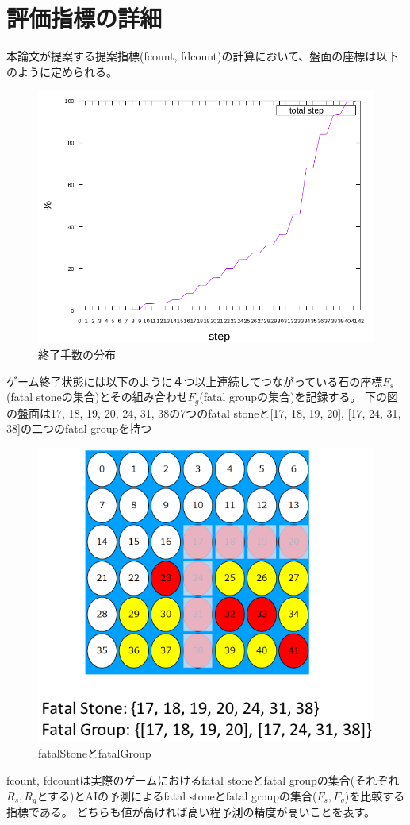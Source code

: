 \section{評価指標の詳細}
本論文が提案する提案指標(fcount, fdcount)の計算において、盤面の座標は以下のように定められる。
\begin{figure}[t]
	\centering
	\includegraphics[width=\linewidth]{./figure/stepCum.png}
	\caption{終了手数の分布}
	\label{fig:stepCUm}
\end{figure}
ゲーム終了状態には以下のように４つ以上連続してつながっている石の座標$F_s$(fatal stoneの集合)とその組み合わせ$F_g$(fatal groupの集合)を記録する。
下の図の盤面は{17, 18, 19, 20, 24, 31, 38}の7つのfatal stoneと{[17, 18, 19, 20], [17, 24, 31, 38]}の二つのfatal groupを持つ
\begin{figure}[t]
	\centering
	\includegraphics[width=\linewidth]{./figure/fatalGroup.png}
	\caption{fatalStoneとfatalGroup}
	\label{fig:fatalGroup}
\end{figure}
fcount, fdcountは実際のゲームにおけるfatal stoneとfatal groupの集合(それぞれ$R_s, R_g$とする)とAIの予測によるfatal stoneとfatal groupの集合($F_s, F_g$)を比較する指標である。
どちらも値が高ければ高い程予測の精度が高いことを表す。
